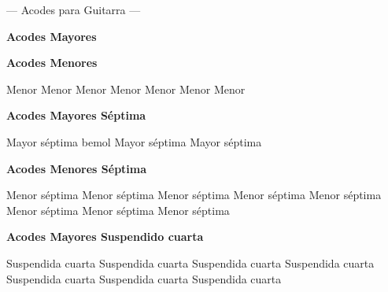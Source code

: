 %

\ifguitarra

\chead{\CHeadFont ({\rm\thepage})}
\rhead{\RHeadFont\RelDate}
{\parindent 8pt
        {\myTitleFont --- Acodes para Guitarra ---}}\par
\vskip 20pt
\textbf{Acodes Mayores}

\small
{}      

      
\normalsize

\textbf{Acodes Menores}

\small
{} Menor  Menor  Menor  Menor  Menor  Menor  Menor

      
\normalsize

\vskip 20pt
\textbf{Acodes Mayores S\'eptima}

 Mayor s\'eptima
 bemol Mayor s\'eptima
 Mayor s\'eptima
\vskip 20pt

\textbf{Acodes Menores S\'eptima}

\small
{} Menor s\'eptima
 Menor s\'eptima
 Menor s\'eptima
 Menor s\'eptima
 Menor s\'eptima
 Menor s\'eptima
 Menor s\'eptima
 Menor s\'eptima
\normalsize
\vskip 20pt

\textbf{Acodes Mayores Suspendido cuarta}

\small
{} Suspendida cuarta
 Suspendida cuarta
 Suspendida cuarta
 Suspendida cuarta
 Suspendida cuarta
 Suspendida cuarta
 Suspendida cuarta

